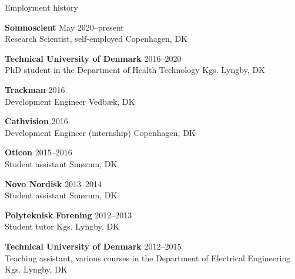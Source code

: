 \documentclass{resume} %
\begin{document}

\begin{rSection}{Employment history}

    {\bf Somnoscient} \hfill {May 2020--present} \\
    Research Scientist, self-employed \hfill {Copenhagen, DK}
    
    {\bf Technical University of Denmark} \hfill {2016--2020} \\
    PhD student in the Department of Health Technology \hfill {Kgs. Lyngby, DK}
    
    {\bf Trackman} \hfill {2016} \\
    Development Engineer \hfill {Vedbæk, DK}
    
    {\bf Cathvision} \hfill {2016} \\
    Development Engineer (internship) \hfill {Copenhagen, DK}
    
    {\bf Oticon} \hfill {2015--2016} \\
    Student assistant \hfill {Smørum, DK}
    
    {\bf Novo Nordisk} \hfill {2013--2014} \\
    Student assistant \hfill {Smørum, DK}
    
    {\bf Polyteknisk Forening} \hfill {2012--2013} \\
    Student tutor \hfill {Kgs. Lyngby, DK}
    
    {\bf Technical University of Denmark} \hfill {2012--2015} \\
    Teaching assistant, various courses in the Department of Electrical Engineering \hfill {Kgs. Lyngby, DK}
    

	

\end{rSection}
\end{document}
